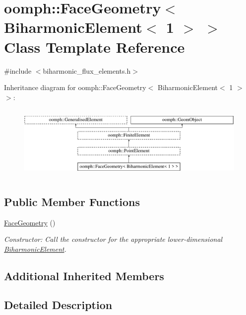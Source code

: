 \hypertarget{classoomph_1_1FaceGeometry_3_01BiharmonicElement_3_011_01_4_01_4}{}\section{oomph\+:\+:Face\+Geometry$<$ Biharmonic\+Element$<$ 1 $>$ $>$ Class Template Reference}
\label{classoomph_1_1FaceGeometry_3_01BiharmonicElement_3_011_01_4_01_4}


{\ttfamily \#include $<$biharmonic\+\_\+flux\+\_\+elements.\+h$>$}

Inheritance diagram for oomph\+:\+:Face\+Geometry$<$ Biharmonic\+Element$<$ 1 $>$ $>$\+:\begin{figure}[H]
\begin{center}
\leavevmode
\includegraphics[height=3.636364cm]{classoomph_1_1FaceGeometry_3_01BiharmonicElement_3_011_01_4_01_4}
\end{center}
\end{figure}
\subsection*{Public Member Functions}
\begin{DoxyCompactItemize}
\item 
\hyperlink{classoomph_1_1FaceGeometry_3_01BiharmonicElement_3_011_01_4_01_4_ae7dff81664b957d531607ba4a7c2a729}{Face\+Geometry} ()
\begin{DoxyCompactList}\small\item\em Constructor\+: Call the constructor for the appropriate lower-\/dimensional \hyperlink{classoomph_1_1BiharmonicElement}{Biharmonic\+Element}. \end{DoxyCompactList}\end{DoxyCompactItemize}
\subsection*{Additional Inherited Members}


\subsection{Detailed Description}
